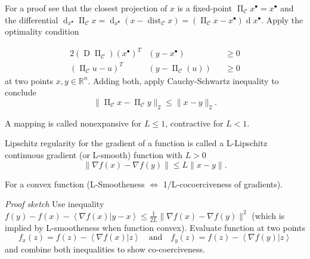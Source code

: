 \documentclass[varwidth=15cm, border=.5cm]{standalone}
\DeclareMathOperator{\jacobian}{D}
\DeclareMathOperator{\proj}{\Pi}
\DeclareMathOperator{\diff}{d}
\DeclareMathOperator{\dist}{dist}
\newcommand{\innerp}[2]{\left\langle #1 \vert #2 \right\rangle}
\newcommand{\optimal}[1]{{#1^{\scriptscriptstyle\bullet}}}
\begin{document}
\begin{definition}[label=5nalj3hx, name=Lipschitz Regularity]
\begin{example}[label=5pxh2ufj, name=Projections]
		For a proof see that the closest projection of \(x\) is a
		fixed-point \(\proj_{\mathcal C}\optimal{x} = \optimal{x}\) and
		the differential \( \diff_\optimal{x}\proj_{\mathcal C}x =
		\diff_\optimal{x}(x - \dist_{\mathcal C}x) = (\proj_{\mathcal C}x
		- \optimal{x})\diff\optimal{x} \). Apply the optimality
		condition 

		\begin{alignat*}{2}
			(\jacobian\proj_{\mathcal C})(\optimal{x})^T&(y - \optimal{x}) &&\geq 0 \\
			(\proj_{\mathcal C}u - u)^T&(y - \proj_{\mathcal C}(u)) &&\geq 0
		\end{alignat*}
		at two points \(x,y\in\mathbb R^n\). Adding both, apply
		Cauchy-Schwartz inequality to conclude
		\[
			\lVert\proj_{\mathcal C}x - \proj_{\mathcal C}y\rVert_2 \leq \rVert x - y\rVert_2.
		\]
		
	\end{example}

	\begin{remark}[label=2s6tfa1j, name=Nonexpansive and Contractive Mappings]
		A mapping is called nonexpansive for \( L \leq 1 \), contractive
		for \( L < 1 \).
	\end{remark}
\end{definition}

\begin{definition}[label=ceh4aors, name=L-Lipschitz Continuous Gradient or L-Smootheness]
	Lipschitz regularity for the gradient of a function is called a 
	L-Lipschitz continuous gradient (or L-smooth) function with \( L > 0\)
	\[
		\lVert\nabla f(x) - \nabla f(y)\rVert\leq L\lVert x - y\rVert.
	\]

	\begin{remark}[label=5vsiv5i2, name=Cocoerciveness of L-Smooth functions]
		For a convex function (L-Smootheness \( \Longleftrightarrow \)
		1/L-cocoerciveness of gradients).

		\textit{Proof sketch} Use inequality \(f(y)-f(x)-\innerp{\nabla
		f(x)}{y-x} \leq \frac{1}{2L}\lVert\nabla f(x) - \nabla
		f(y)\rVert^2\) (which is implied by L-smootheness when function
		convex). Evaluate function at two points
		\[
			f_x(z)= f(z) - \innerp{\nabla f(x)}{z} \quad \text{and}
			\quad f_y(z) = f(z) - \innerp{\nabla f(y)}{z}
		\]
		and combine both inequalities to show co-coerciveness.
	\end{remark}
\end{definition}
\end{document}
